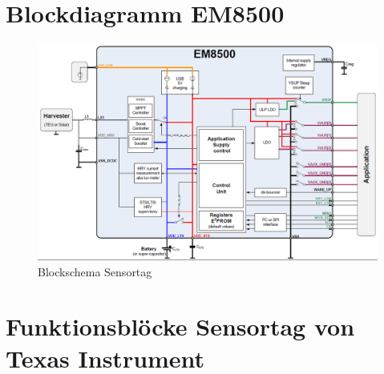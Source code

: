 \chapter{Blockdiagramm EM8500}\label{anhang_em8500} 
\begin{figure}[h]
    \includegraphics {7Anhang/imag/blockdiagrammEm8500.png} 
     \caption{Blockschema Sensortag}
\end{figure}



\chapter{Funktionsblöcke Sensortag von Texas Instrument}\label{anhang_sensortag} 



